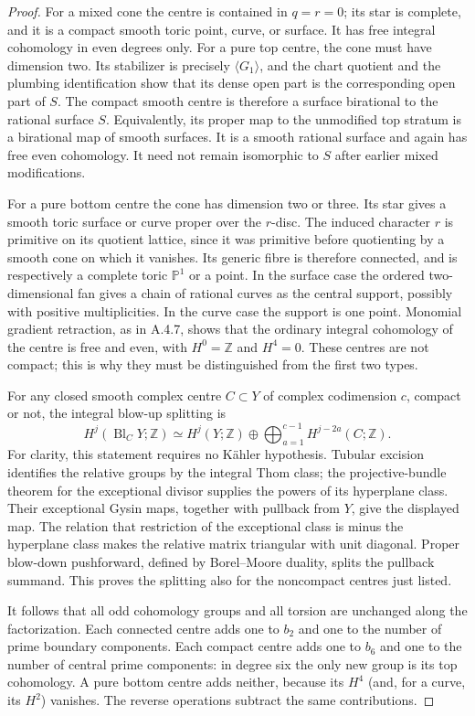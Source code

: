 \begin{proof}
For a mixed cone the centre is contained in $q=r=0$;
its star is complete, and it is a compact smooth toric
point, curve, or surface. It has free integral
cohomology in even degrees only. For a pure top centre,
the cone must have dimension two. Its stabilizer is
precisely $\langle G_1\rangle$, and the chart quotient
and the plumbing identification show that its dense
open part is the corresponding open part of $S$.
The compact smooth centre is therefore a surface
birational to the rational surface $S$. Equivalently,
its proper map to the unmodified top stratum is a
birational map of smooth surfaces. It is a smooth
rational surface and again has free even cohomology.
It need not remain isomorphic to $S$ after earlier
mixed modifications.

For a pure bottom centre the cone has dimension two
or three. Its star gives a smooth toric surface or
curve proper over the $r$-disc. The induced character
$r$ is primitive on its quotient lattice, since it
was primitive before quotienting by a smooth cone
on which it vanishes. Its generic fibre is therefore
connected, and is respectively a complete toric
$\mathbb P^1$ or a point. In the surface case the
ordered two-dimensional fan gives a chain of rational
curves as the central support, possibly with positive
multiplicities. In the curve case the support is one
point. Monomial gradient retraction, as in A.4.7,
shows that the ordinary integral cohomology of the
centre is free and even, with $H^0=\mathbb Z$ and
$H^4=0$. These centres are not compact; this is why
they must be distinguished from the first two types.

For any closed smooth complex centre $C\subset Y$ of
complex codimension $c$, compact or not, the integral
blow-up splitting is
\[
 H^j(\operatorname{Bl}_C Y;\mathbb Z)
 \simeq H^j(Y;\mathbb Z)\oplus
       \bigoplus_{a=1}^{c-1}H^{j-2a}(C;\mathbb Z).
\]
For clarity, this statement requires no K\"ahler
hypothesis. Tubular excision identifies the relative
groups by the integral Thom class; the projective-bundle
theorem for the exceptional divisor supplies the powers
of its hyperplane class. Their exceptional Gysin maps,
together with pullback from $Y$, give the displayed
map. The relation that restriction of the exceptional
class is minus the hyperplane class makes the relative
matrix triangular with unit diagonal. Proper
blow-down pushforward, defined by Borel--Moore duality,
splits the pullback summand. This proves the splitting
also for the noncompact centres just listed.

It follows that all odd cohomology groups and all
torsion are unchanged along the factorization. Each
connected centre adds one to $b_2$ and one to the number
of prime boundary components. Each compact centre
adds one to $b_6$ and one to the number of central
prime components: in degree six the only new group
is its top cohomology. A pure bottom centre adds
neither, because its $H^4$ (and, for a curve, its
$H^2$) vanishes. The reverse operations subtract
the same contributions.


\end{proof}
